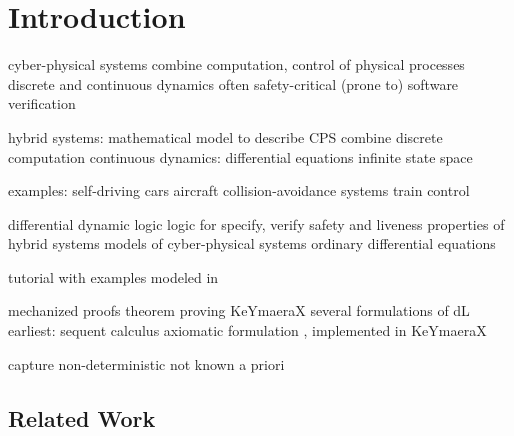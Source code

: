 \chapter{Introduction}

	cyber-physical systems
	combine computation, control of physical processes
	discrete and continuous dynamics
	often safety-critical
	(prone to) software verification

	hybrid systems: mathematical model to describe CPS
	combine discrete computation
	continuous dynamics: differential equations
	infinite state space

	examples:
	self-driving cars
	aircraft collision-avoidance systems
	train control



	differential dynamic logic
	logic for specify, verify safety and liveness properties
	of hybrid systems
	models of cyber-physical systems
	ordinary differential equations

	tutorial with examples modeled in \dL
	\cite{Quesel16Tutorial}

	mechanized proofs
	theorem proving
	KeYmaeraX
	several formulations of dL
	earliest: sequent calculus \cite{Platzer10HybridSystems}
	axiomatic formulation \cite{Platzer15Uniform}, implemented in KeYmaeraX

	capture non-deterministic
	not known a priori

	\section{Related Work}
	\cite{Huang16BoundedVerificationNNDS}